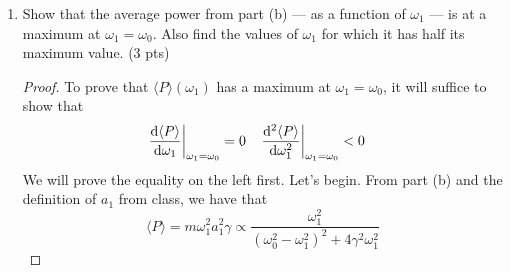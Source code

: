 \documentclass[../psets.tex]{subfiles}
\begin{document}
\begin{enumerate}
\begin{enumerate}
\begin{proof}
\begin{align*}
                &= m\omega_1^2a_1^2\gamma
            \end{align*}
            as desired.\par\smallskip
            Step 2: From the original driven, damped harmonic oscillator equation, we may read off that the resistive force is
            \begin{equation*}
                F_r = \lambda\dot{x}
            \end{equation*}
            Thus, its power is
            \begin{equation*}
                P_r = F_r\dot{x}
                = \lambda\dot{x}^2
                = 2m\gamma\cdot\omega_1^2a_1^2\sin^2(\omega_1t-\theta_1)
                = 2m\omega_1^2a_1^2\gamma\sin^2(\omega_1t-\theta_1)
            \end{equation*}
            Averaging once again, we obtain
            \begin{align*}
                \langle P_r\rangle &= \frac{1}{\tau}\int_0^\tau P_r\dd{t}\\
                &= 2m\omega_1^2a_1^2\gamma\cdot\frac{1}{\tau}\int_0^\tau\sin^2(\omega_1t-\theta_1)\dd{t}\\
                &= 2m\omega_1^2a_1^2\gamma\cdot\frac{1}{2}\\
                &= m\omega_1^2a_1^2\gamma
            \end{align*}
            as desired.
        \end{proof}
        \item Show that the average power from part (b) --- as a function of $\omega_1$ --- is at a maximum at $\omega_1=\omega_0$. Also find the values of $\omega_1$ for which it has half its maximum value. (3 pts)
        \begin{proof}
            To prove that $\langle P\rangle(\omega_1)$ has a maximum at $\omega_1=\omega_0$, it will suffice to show that
            \begin{align*}
                \eval{\dv{\langle P\rangle}{\omega_1}}_{\omega_1=\omega_0} &= 0&
                \eval{\dv[2]{\langle P\rangle}{\omega_1}}_{\omega_1=\omega_0} &< 0
            \end{align*}
            We will prove the equality on the left first. Let's begin. From part (b) and the definition of $a_1$ from class, we have that
            \begin{equation*}
                \langle P\rangle = m\omega_1^2a_1^2\gamma
                \propto \frac{\omega_1^2}{(\omega_0^2-\omega_1^2)^2+4\gamma^2\omega_1^2}

\end{equation*}
\end{proof}
\end{enumerate}
\end{enumerate}
\end{document}
